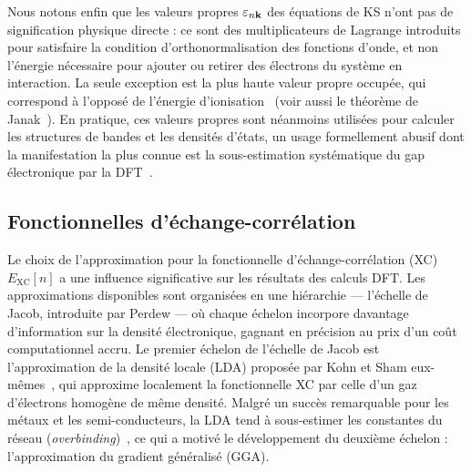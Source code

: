Nous notons enfin que les valeurs propres $\varepsilon_{n\mathbf{k}}$ des équations de KS n'ont pas de signification physique directe : ce sont des multiplicateurs de Lagrange introduits pour satisfaire la condition d'orthonormalisation des fonctions d'onde, et non l'énergie nécessaire pour ajouter ou retirer des électrons du système en interaction. La seule exception est la plus haute valeur propre occupée, qui correspond à l'opposé de l'énergie d'ionisation~\cite{perdewDensityFunctionalTheoryFractional1982,almbladhExactResultsCharge1985} (voir aussi le théorème de Janak~\cite{janakProof1978}). En pratique, ces valeurs propres sont néanmoins utilisées pour calculer les structures de bandes et les densités d'états, un usage formellement abusif dont la manifestation la plus connue est la sous-estimation systématique du gap électronique par la DFT~\cite{perdewPhysicalContentExact1983,shamDensityFunctionalTheoryEnergy1983}.

\subsection{Fonctionnelles d'échange-corrélation}\label{sec:XC}

Le choix de l'approximation pour la fonctionnelle d'échange-corrélation (XC) $E_\text{XC}[n]$ a une influence significative sur les résultats des calculs DFT. Les approximations disponibles sont organisées en une hiérarchie --- l'échelle de Jacob, introduite par Perdew \cite{perdewJacobsLadderDensity2001} --- où chaque échelon incorpore davantage d'information sur la densité électronique, gagnant en précision au prix d'un coût computationnel accru. Le premier échelon de l'échelle de Jacob est l'approximation de la densité locale (LDA) proposée par Kohn et Sham eux-mêmes~\cite{kohnSelfConsistentEquationsIncluding1965}, qui approxime localement la fonctionnelle XC par celle d'un gaz d'électrons homogène de même densité. Malgré un succès remarquable pour les métaux et les semi-conducteurs, la LDA tend à sous-estimer les constantes du réseau (\textit{overbinding})~\cite{perdewAtomsMoleculesSolids1992}, ce qui a motivé le développement du deuxième échelon : l'approximation du gradient généralisé (GGA).

